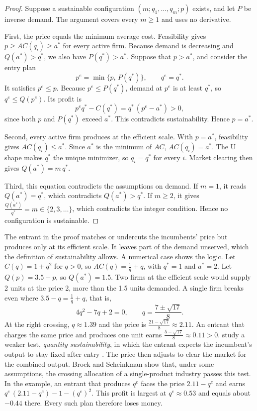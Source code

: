 \begin{proof}
Suppose a sustainable configuration $(m; q_1, \dots, q_m; p)$ exists, and let $P$ be inverse demand. The
argument covers every $m \ge 1$ and uses no derivative.

First, the price equals the minimum average cost. Feasibility gives $p \ge AC(q_i) \ge a^*$ for every active
firm. Because demand is decreasing and $Q(a^*) > q^*$, we also have $P(q^*) > a^*$. Suppose that $p > a^*$,
and consider the entry plan
\begin{equation*}
  p^e = \min\{p,\, P(q^*)\}, \qquad q^e = q^*.
\end{equation*}
It satisfies $p^e \le p$. Because $p^e \le P(q^*)$, demand at $p^e$ is at least $q^*$, so $q^e \le Q(p^e)$. Its
profit is
\begin{equation*}
  p^e q^* - C(q^*) = q^*\,(p^e - a^*) > 0,
\end{equation*}
since both $p$ and $P(q^*)$ exceed $a^*$. This contradicts sustainability. Hence $p = a^*$.

Second, every active firm produces at the efficient scale. With $p = a^*$, feasibility gives
$AC(q_i) \le a^*$. Since $a^*$ is the minimum of $AC$, $AC(q_i) = a^*$. The U shape makes $q^*$ the unique
minimizer, so $q_i = q^*$ for every $i$. Market clearing then gives $Q(a^*) = m\,q^*$.

Third, this equation contradicts the assumptions on demand. If $m = 1$, it reads $Q(a^*) = q^*$, which
contradicts $Q(a^*) > q^*$. If $m \ge 2$, it gives $\frac{Q(a^*)}{q^*} = m \in \{2, 3, \dots\}$, which
contradicts the integer condition. Hence no configuration is sustainable.
\end{proof}

The entrant in the proof matches or undercuts the incumbents' price but produces only at its efficient scale. It
leaves part of the demand unserved, which the definition of sustainability allows. A numerical case shows the
logic. Let $C(q) = 1 + q^2$ for $q > 0$, so $AC(q) = \frac{1}{q} + q$, with $q^* = 1$ and $a^* = 2$. Let
$Q(p) = 3.5 - p$, so $Q(a^*) = 1.5$. Two firms at the efficient scale would supply 2 units at the price 2,
more than the 1.5 units demanded. A single firm breaks even where $3.5 - q = \frac{1}{q} + q$, that is,
\begin{equation*}
  4q^2 - 7q + 2 = 0, \qquad q = \frac{7 \pm \sqrt{17}}{8}.
\end{equation*}
At the right crossing, $q \approx 1.39$ and the price is $\frac{21 - \sqrt{17}}{8} \approx 2.11$. An entrant that
charges the same price and produces one unit earns $\frac{5 - \sqrt{17}}{8} \approx 0.11 > 0$. \citet{BrockScheinkman1983} study a weaker test, \emph{quantity sustainability}, in which the entrant expects
the incumbent's output to stay fixed after entry \citep[sec.~8.1.2, n.~12]{Tirole1988}. The price then adjusts
to clear the market for the combined output. Brock and Scheinkman show that, under some assumptions, the
crossing allocation of a single-product industry passes this test. In the example, an entrant that produces
$q^e$ faces the price $2.11 - q^e$ and earns $q^e\,(2.11 - q^e) - 1 - (q^e)^2$. This profit is largest at
$q^e \approx 0.53$ and equals about $-0.44$ there. Every such plan therefore loses money.

